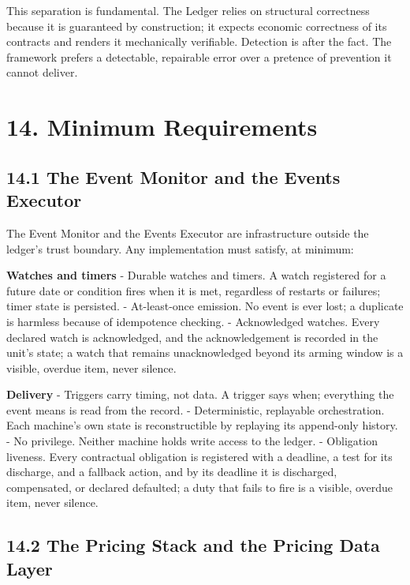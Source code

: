 \documentclass[11pt,a4paper]{article}
\newcommand{\clabel}[1]{\leavevmode\hypertarget{clause-#1}{}%
  \marginpar{\raggedright\scriptsize\ttfamily\textcolor{gray}{#1}}}
\begin{document}
This separation is fundamental. \clabel{C-13.3}The Ledger relies on structural
correctness because it is guaranteed by construction; it expects
economic correctness of its contracts and renders it mechanically
verifiable. Detection is after the fact. The framework prefers a
detectable, repairable error over a pretence of prevention it cannot
deliver.

\hypertarget{minimum-requirements}{%
\section{14. Minimum Requirements}\label{minimum-requirements}}

\hypertarget{the-event-monitor-and-the-events-executor}{%
\subsection{14.1 The Event Monitor and the Events
Executor}\label{the-event-monitor-and-the-events-executor}}

\clabel{C-14.1}The Event Monitor and the Events Executor are infrastructure outside the
ledger's trust boundary. Any implementation must satisfy, at minimum:

\textbf{Watches and timers} - \clabel{C-14.2}Durable watches and timers. A watch
registered for a future date or condition fires when it is met,
regardless of restarts or failures; timer state is persisted. -
\clabel{C-14.3}At-least-once emission. No event is ever lost; a duplicate is harmless
because of idempotence checking. - \clabel{C-14.4}Acknowledged watches. Every declared
watch is acknowledged, and the acknowledgement is recorded in the unit's
state; a watch that remains unacknowledged beyond its arming window is a
visible, overdue item, never silence.

\textbf{Delivery} - \clabel{C-14.5}Triggers carry timing, not data. A trigger says
when; everything the event means is read from the record. -
\clabel{C-14.6}Deterministic, replayable orchestration. Each machine's own state is
reconstructible by replaying its append-only history. - \clabel{C-14.7}No privilege.
Neither machine holds write access to the ledger. - \clabel{C-14.8}Obligation liveness.
Every contractual obligation is registered with a deadline, a test for
its discharge, and a fallback action, and by its deadline it is
discharged, compensated, or declared defaulted; a duty that fails to
fire is a visible, overdue item, never silence.

\hypertarget{the-pricing-stack-and-the-pricing-data-layer}{%
\subsection{14.2 The Pricing Stack and the Pricing Data
Layer}\label{the-pricing-stack-and-the-pricing-data-layer}}
\end{document}
